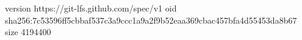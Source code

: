 version https://git-lfs.github.com/spec/v1
oid sha256:7c53596ff5cbbaf537c3a9ccc1a9a2f9b52eaa369cbac457bfa4d55453da8b67
size 4194400
